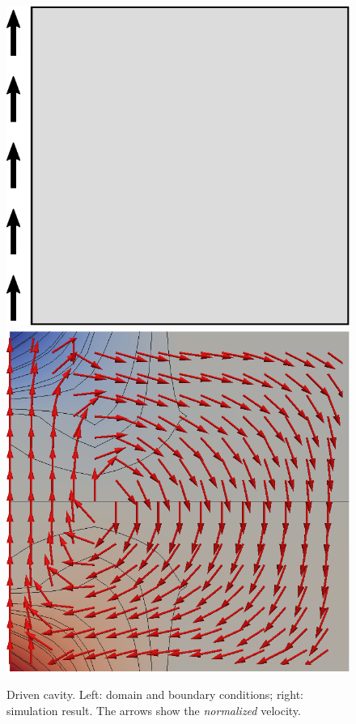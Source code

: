 \documentclass[a4paper,10pt,headings=normal,bibliography=totoc]{scrartcl}
\begin{document}
\begin{figure}
 \begin{center}
  \includegraphics[height=0.3\textheight]{driven_cavity}
  \qquad
  \includegraphics[height=0.3\textheight]{driven_cavity_result}
 \end{center}
 \caption{Driven cavity. Left: domain and boundary conditions;
     right: simulation result.  The arrows show the {\em normalized} velocity.}
 \label{fig:driven_cavity}
\end{figure}
\end{document}

